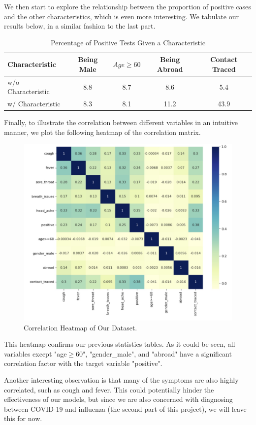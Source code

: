 \documentclass[a4paper, 11pt]{article}
\begin{document}
We then start to explore the relationship between the proportion of positive cases and the other characteristics, which is even more interesting. We tabulate our results below, in a similar fashion to the last part.
\begin{table}[H]
\centering
\caption{Percentage of Positive Tests Given a Characteristic}
\begin{tabular}{| l | c | c | c | c |}
\hline
Characteristic & Being Male & $Age \ge 60$ & Being Abroad & Contact Traced  \\ \hline
w/o Characteristic & 8.8 & 8.7 & 8.6 & 5.4 \\ \hline
w/ Characteristic & 8.3 & 8.1 & 11.2 & 43.9 \\
\hline
\end{tabular}
\label{Table}
\end{table}

Finally, to illustrate the correlation between different variables in an intuitive manner, we plot the following heatmap of the correlation matrix.
\begin{figure}[H]
\centering
\includegraphics[scale=0.23]{heatmap.jpg}
\caption{Correlation Heatmap of Our Dataset.}
\label{heatmap}
\end{figure}

This heatmap confirms our previous statistics tables. As it could be seen, all variables except "age$\geq$60", "gender\_male", and "abroad" have a significant correlation factor with the target variable "positive". \par
Another interesting observation is that many of the symptoms are also highly correlated, such as cough and fever. This could potentially hinder the effectiveness of our models, but since we are also concerned with diagnosing between COVID-19 and influenza (the second part of this project), we will leave this for now.
\end{document}
